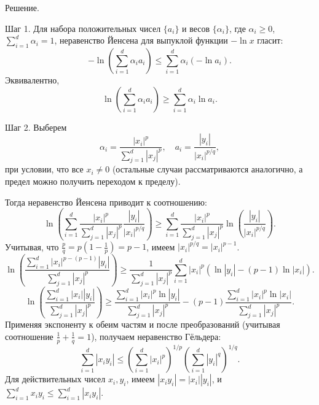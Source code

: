 \documentclass[a4paper,12pt]{article}
\begin{document}
	Решение.
	
	Шаг 1. Для набора положительных чисел $\{a_i\}$ и весов $\{\alpha_i\}$, где $\alpha_i \ge 0$, $\sum_{i=1}^{d} \alpha_i = 1$, неравенство Йенсена для выпуклой функции $-\ln x$ гласит:
	$$
	-\ln\left(\sum_{i=1}^{d} \alpha_i a_i\right) \le \sum_{i=1}^{d} \alpha_i (-\ln a_i).
	$$
	Эквивалентно,
	$$
	\ln\left(\sum_{i=1}^{d} \alpha_i a_i\right) \ge \sum_{i=1}^{d} \alpha_i \ln a_i.
	$$
	
	Шаг 2. Выберем
	$$
	\alpha_i = \frac{|x_i|^p}{\sum_{j=1}^{d} |x_j|^p}, \quad a_i = \frac{|y_i|}{|x_i|^{p/q}},
	$$
	при условии, что все $x_i \ne 0$ (остальные случаи рассматриваются аналогично, а предел можно получить переходом к пределу).
	
	Тогда неравенство Йенсена приводит к соотношению:
	$$
	\ln\left(\sum_{i=1}^{d} \frac{|x_i|^p}{\sum_{j=1}^{d} |x_j|^p} \frac{|y_i|}{|x_i|^{p/q}}\right) \ge \sum_{i=1}^{d} \frac{|x_i|^p}{\sum_{j=1}^{d} |x_j|^p} \ln\left(\frac{|y_i|}{|x_i|^{p/q}}\right).
	$$
	Учитывая, что $\frac{p}{q} = p(1 - \frac{1}{p}) = p - 1$, имеем $|x_i|^{p/q} = |x_i|^{p-1}$.
	$$
	\ln\left(\frac{\sum_{i=1}^{d} |x_i|^{p - (p-1)} |y_i|}{\sum_{j=1}^{d} |x_j|^p}\right) \ge \frac{1}{\sum_{j=1}^{d} |x_j|^p} \sum_{i=1}^{d} |x_i|^p (\ln |y_i| - (p-1) \ln |x_i|).
	$$
	$$
	\ln\left(\frac{\sum_{i=1}^{d} |x_i| |y_i|}{\sum_{j=1}^{d} |x_j|^p}\right) \ge \frac{\sum_{i=1}^{d} |x_i|^p \ln |y_i|}{\sum_{j=1}^{d} |x_j|^p} - (p-1) \frac{\sum_{i=1}^{d} |x_i|^p \ln |x_i|}{\sum_{j=1}^{d} |x_j|^p}.
	$$
	Применяя экспоненту к обеим частям и после преобразований (учитывая соотношение $\frac{1}{p} + \frac{1}{q} = 1$), получаем неравенство Гёльдера:
	$$
	\sum_{i=1}^{d} |x_i y_i| \le \left(\sum_{i=1}^{d} |x_i|^p\right)^{1/p} \left(\sum_{i=1}^{d} |y_i|^q\right)^{1/q}.
	$$
	Для действительных чисел $x_i, y_i$, имеем $|x_i y_i| = |x_i| |y_i|$, и $\sum_{i=1}^{d} x_i y_i \le \sum_{i=1}^{d} |x_i y_i|$.
	
\end{document}
